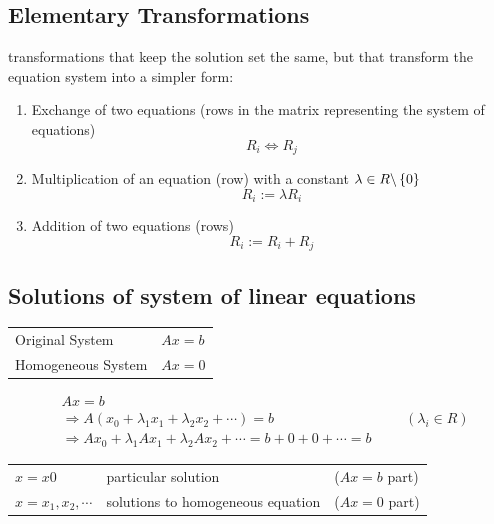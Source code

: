 \subsection{Elementary Transformations \cite{mfml-1}} \label{Elementary Transformations}
transformations that keep the solution set the same, but that transform the equation system into a simpler form:
\begin{enumerate}
    \item Exchange of two equations (rows in the matrix representing the system of equations)
    \[ R_i \Leftrightarrow R_j \]

    \item Multiplication of an equation (row) with a constant $\lambda \in R\backslash \left\{0\right\}$
    \[ R_i := \lambda R_i \]

    \item Addition of two equations (rows)
    \[ R_i := R_i + R_j \]

\end{enumerate}


\subsection{Solutions of system of linear equations \cite{mfml-1}}\label{Solutions of system of linear equations}

\begin{customTableWrapper}{1}
\begin{table}[h]
    \begin{tabular}{l l}
        Original System	& $Ax = b$ \\

        Homogeneous System & $Ax = 0$ \\
    \end{tabular}
\end{table}
\end{customTableWrapper}

\[
\begin{aligned}
   & Ax = b \\
   & \Rightarrow A(x_0 + \lambda _1x_1 + \lambda _2x_2 + \cdots ) = b	&&& (\lambda _i \in R) \\
   & \Rightarrow Ax_0 + \lambda _1Ax_1 + \lambda _2Ax_2 + \cdots  = b + 0 + 0 + \cdots  = b
\end{aligned}
\]

\begin{table}[h]
    \begin{tabular}{l l l}
        $x = x0$ & particular solution & ($Ax = b$ part) \\
        
        $x = x_1, x_2, \cdots$ & solutions to homogeneous equation & ($Ax = 0$ part)
    \end{tabular}
\end{table}

